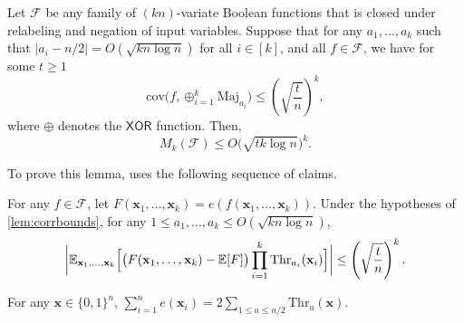 \begin{lemma}
\label{lem:corrbounds}
Let $\mathcal{F}$ be any family of $(kn)$-variate Boolean functions that is closed under relabeling and negation of input variables.  Suppose that for any $a_1,\ldots,a_k$ such that $\vert a_i-n/2\vert = O(\sqrt{kn \log n})$ for all $i\in [k]$, and all $f\in \mathcal{F}$, we have for some $t\geq 1$
\begin{equation*}
    \mathrm{cov} \bigl(f, \oplus_{i=1}^k \mathrm{Maj}_{a_i} \bigr)
    \leq \left(\sqrt{\frac{t}{n}}\right)^k,
\end{equation*}
%
where $\oplus$ denotes the $\mathsf{XOR}$ function.
Then, 
\begin{equation*}
    M_k(\mathcal{F})\leq O \bigl(\sqrt{tk\log n} \bigr)^k.
\end{equation*}
\end{lemma}
To prove this lemma, \cite{xorlemma} uses the following sequence of claims. 
\begin{fact} 
\label{fact:f1}
 For any $f\in \mathcal{F}$, let $F(\mathbf{x}_1,\ldots,\mathbf{x}_k)=e(f(\mathbf{x}_1,\ldots,\mathbf{x}_k))$. Under the hypotheses of \cref{lem:corrbounds}, for any $1\leq a_1,\ldots,a_k\leq O(\sqrt{kn\log n})$, 
\begin{equation*}
    \biggl| \mathbb{E}_{\mathbf{x}_1,\ldots,\mathbf{x}_k} \Bigl[ \bigl(F(\mathbf{x}_1,\ldots,\mathbf{x}_k)-\mathbb{E}[F] \bigr) \prod_{i=1}^k \mathrm{Thr}_{a_i}(\mathbf{x}_i) \Bigr] \biggr| \leq \left(\sqrt{\frac{t}{n}}\right)^k.
\end{equation*}
\end{fact}


\begin{fact}
\label{fact:f2}
For any $\mathbf{x}\in \{0,1\}^n$, $\sum_{i=1}^n e(\mathbf{x}_i)=2\sum_{1\leq a\leq n/2} \mathrm{Thr}_a(\mathbf{x})$.
\end{fact}

